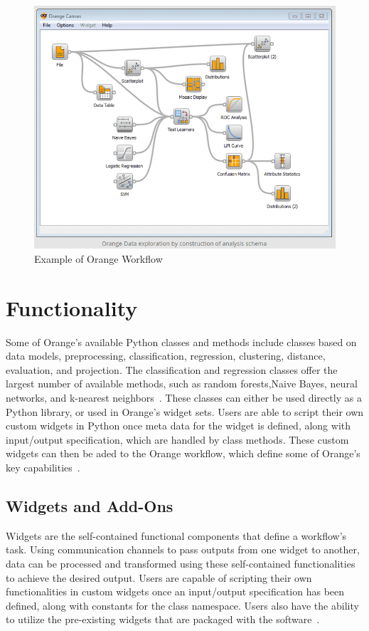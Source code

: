 \begin{figure}[!ht]
  \centering
  \includegraphics[width=\columnwidth]{images/orangeworkflow-predanalytics.png}
  \caption{Example
  of Orange Workflow~\cite{hid-sp18-504-predanalytics} }
\label{f:fig1}
\end{figure}

\section{Functionality}
Some of Orange's available Python classes and methods
include classes based on data models, preprocessing,
classification, regression, clustering, distance,
evaluation, and projection. The classification and
regression classes offer the largest number of available methods,
such as random forests,Naive Bayes, neural networks,
and k-nearest neighbors~\cite{hid-sp18-504-orange}.
These classes can either be used directly as a Python library, or used
in Orange's widget sets. Users are able to script their own
custom widgets in Python once meta data for the widget
is defined, along with input/output specification, which
are handled by class methods. These custom widgets
can then be aded to the  Orange workflow, which define
some of Orange's key capabilities~\cite{hid-sp18-504-wiki-orange}.

\subsection{Widgets and Add-Ons}
Widgets are the self-contained functional components that
define a workflow's task. Using
communication channels to pass outputs from one widget to another,
data can be processed and transformed  using these self-contained
functionalities to achieve the desired output. Users are capable of
scripting their own functionalities in custom widgets once an input/output
specification has been defined, along with constants for the class
namespace. Users also have the ability to utilize the pre-existing
widgets that are packaged with the software~\cite{hid-sp18-504-orange}.

